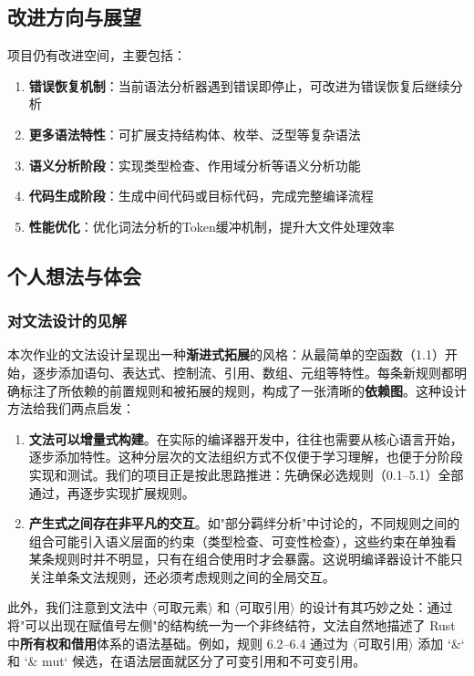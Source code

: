 \documentclass[12pt,a4paper]{ctexart}
\begin{document}
\subsection{改进方向与展望}

项目仍有改进空间，主要包括：

\begin{enumerate}
    \item \textbf{错误恢复机制}：当前语法分析器遇到错误即停止，可改进为错误恢复后继续分析
    \item \textbf{更多语法特性}：可扩展支持结构体、枚举、泛型等复杂语法
    \item \textbf{语义分析阶段}：实现类型检查、作用域分析等语义分析功能
    \item \textbf{代码生成阶段}：生成中间代码或目标代码，完成完整编译流程
    \item \textbf{性能优化}：优化词法分析的Token缓冲机制，提升大文件处理效率
\end{enumerate}

\subsection{个人想法与体会}

\subsubsection{对文法设计的见解}

本次作业的文法设计呈现出一种\textbf{渐进式拓展}的风格：从最简单的空函数（1.1）开始，逐步添加语句、表达式、控制流、引用、数组、元组等特性。每条新规则都明确标注了所依赖的前置规则和被拓展的规则，构成了一张清晰的\textbf{依赖图}。这种设计方法给我们两点启发：

\begin{enumerate}
    \item \textbf{文法可以增量式构建}。在实际的编译器开发中，往往也需要从核心语言开始，逐步添加特性。这种分层次的文法组织方式不仅便于学习理解，也便于分阶段实现和测试。我们的项目正是按此思路推进：先确保必选规则（0.1--5.1）全部通过，再逐步实现扩展规则。

    \item \textbf{产生式之间存在非平凡的交互}。如"部分羁绊分析"中讨论的，不同规则之间的组合可能引入语义层面的约束（类型检查、可变性检查），这些约束在单独看某条规则时并不明显，只有在组合使用时才会暴露。这说明编译器设计不能只关注单条文法规则，还必须考虑规则之间的全局交互。
\end{enumerate}

此外，我们注意到文法中 $\langle\text{可取元素}\rangle$ 和 $\langle\text{可取引用}\rangle$ 的设计有其巧妙之处：通过将"可以出现在赋值号左侧"的结构统一为一个非终结符，文法自然地描述了 Rust 中\textbf{所有权和借用}体系的语法基础。例如，规则 6.2--6.4 通过为 $\langle\text{可取引用}\rangle$ 添加 `\&` 和 `\& mut` 候选，在语法层面就区分了可变引用和不可变引用。
\end{document}
